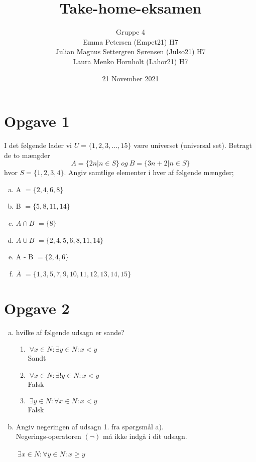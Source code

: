 \documentclass{article}
\title{\textbf{Take-home-eksamen}}
\author{Gruppe 4\\ Emma Petersen (Empet21) H7 \\ Julian Magnus Settergren Sørensen (Julso21) H7 \\ Laura Menko Hornholt (Lahor21) H7 }
\date{21 November 2021}
\begin{document}
\maketitle
\newpage
\section{Opgave 1}
I det følgende lader vi 
$U= \{1, 2, 3, . . . , 15\}$
være universet (universal set).
Betragt de to mængder
$$A = \{2n | n \in S\} ~ og ~ B = \{3n + 2 | n \in S\}$$ 
hvor
$S = \{1, 2, 3, 4\}.$
Angiv samtlige elementer i hver af følgende mængder; \\

\begin{enumerate}[a)]
    \item A $ = \{2,4,6,8\}$
    \item B $ = \{5,8,11,14\}$ 
    \item $A \cap B$ $=\{8\}$
    \item $A \cup B$ $=\{2,4,5,6,8,11,14\}$
    \item A - B $=\{2,4,6\}$
    \item $\overline{A}$ $=\{1,3,5,7,9,10,11,12,13,14,15\}$
\end{enumerate}

\section{Opgave 2}
\begin{enumerate}[a)]
    \item hvilke af følgende udsagn er sande?\\
    \begin{enumerate}[1)]
        \item $ ~ \forall x \in N: \exists y \in N: x < y $ \\
        Sandt
        \item $ ~ \forall x \in N: \exists! y \in N: x < y $ \\
        Falsk
        \item $ ~ \exists y \in N: \forall x \in N: x < y $ \\
        Falsk
    \end{enumerate}
    \item Angiv negeringen af udsagn 1. fra spørgsmål a). \\ Negerings-operatoren $(\neg)$ må ikke indgå i dit udsagn. \\
    \\
    $ ~ \exists x \in N: \forall y \in N: x \geq y $
    
\end{enumerate}
\end{document}
